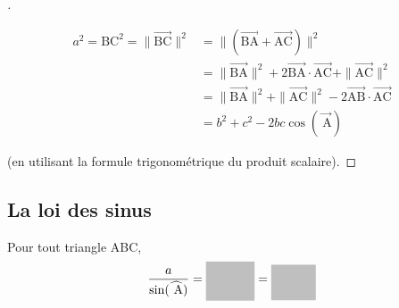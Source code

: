 \documentclass[12pt]{article}
\theoremstyle{break}
\newenvironment{demo}[1][\proofname]{%
  \begin{proof}[#1]$ $\newline
  }{%
  \end{proof}
}
\begin{document}
\begin{demo}
  $$
  \begin{aligned}
    a^{2}=\mathrm{BC}^{2}=\|\overrightarrow{\mathrm{BC}}\|^{2} & =\|(\overrightarrow{\mathrm{BA}}+\overrightarrow{\mathrm{AC}})\|^{2} \\
    & =\|\overrightarrow{\mathrm{BA}}\|^{2}+2 \overrightarrow{\mathrm{BA}} \cdot \overrightarrow{\mathrm{AC}}+\|\overrightarrow{\mathrm{AC}}\|^{2} \\
    & =\|\overrightarrow{\mathrm{BA}}\|^{2}+\|\overrightarrow{\mathrm{AC}}\|^{2}-2 \overrightarrow{\mathrm{AB}} \cdot \overrightarrow{\mathrm{AC}} \\
    & =b^{2}+c^{2}-2 b c \cos (\overrightarrow{\mathrm{~A}})
  \end{aligned}
  $$

  (en utilisant la formule trigonométrique du produit scalaire).
\end{demo}

\subsection{La loi des sinus}
\begin{proposition}{}{}
  Pour tout triangle ABC,

  $$
  \frac{a}{\sin (\widehat{\mathrm{~A}})}=\hideM{\frac{b}{\sin (\widehat{\mathrm{~B}})}}=\hideM{\frac{c}{\sin (\widehat{\mathrm{C}})}}
  $$
\end{proposition}
\end{document}
